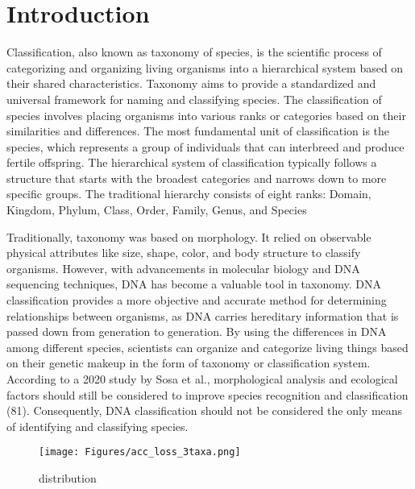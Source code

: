 \section{Introduction}

Classification, also known as taxonomy of species, is the scientific process of categorizing and organizing living organisms into a hierarchical system based on their shared characteristics. Taxonomy aims to provide a standardized and universal framework for naming and classifying species. The classification of species involves placing organisms into various ranks or categories based on their similarities and differences. The most fundamental unit of classification is the species, which represents a group of individuals that can interbreed and produce fertile offspring.
The hierarchical system of classification typically follows a structure that starts with the broadest categories and narrows down to more specific groups. The traditional hierarchy consists of eight ranks: Domain, Kingdom, Phylum, Class, Order, Family, Genus, and Species

Traditionally, taxonomy was based on morphology. It relied on observable physical attributes like size, shape, color, and body structure to classify organisms. However, with advancements in molecular biology and DNA sequencing techniques, DNA has become a valuable tool in taxonomy. DNA classification provides a more objective and accurate method for determining relationships between organisms, as DNA carries hereditary information that is passed down from generation to generation.  By using the differences in DNA among different species, scientists can organize and categorize living things based on their genetic makeup in the form of taxonomy or classification system. According to a 2020 study by Sosa et al., morphological analysis and ecological factors should still be considered to improve species recognition and classification (81). Consequently, DNA classification should not be considered the only means of identifying and classifying species. 

\begin{figure*}[t]
\begin{centering}
		\texttt{[image: Figures/acc\_loss\_3taxa.png]}
	\caption{distribution  }
\label{fig:cnn-archit}
\end{centering}
\end{figure*}

